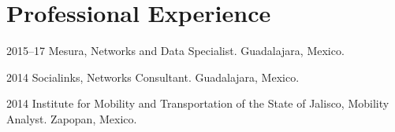 \documentclass{academiccv}
\begin{document}







	



\section*{Professional Experience}

\begin{tablist}
	
\item[2015--17] \tab Mesura, Networks and Data Specialist. Guadalajara, Mexico.

\item[2014] \tab Socialinks, Networks Consultant. Guadalajara, Mexico.

\item[2014] \tab Institute for Mobility and Transportation of the State of Jalisco, Mobility Analyst. Zapopan, Mexico.

\end{tablist}





\end{document}
